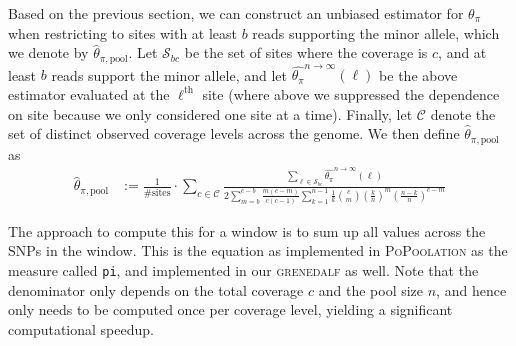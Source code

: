 \documentclass[a4paper,fontsize=9pt,DIV=14]{scrartcl}
\newcounter{todo}
\newcommand\todo[1]{}
\newcommand\toolname{\textsc}
\newcommand{\samplesize}{n}
\newcommand{\coverage}{c}
\newcommand{\thetapi}{\widehat{\theta_\pi}}
\begin{document}
Based on the previous section, we can construct an unbiased estimator for $\theta_\pi$ when restricting to sites with at least $b$ reads supporting the minor allele, which we denote by $\widehat{\theta}_{\pi,\text{pool}}$.  Let $\mathcal{S}_{bc}$ be the set of sites where the coverage is $c$, and at least $b$ reads support the minor allele, and let $\thetapi^{\samplesize\to\infty}(\ell)$ be the above estimator evaluated at the $\ell^\text{th}$ site (where above we suppressed the dependence on site because we only considered one site at a time).  Finally, let $\mathcal{C}$ denote the set of distinct observed coverage levels across the genome.  We then define  $\widehat{\theta}_{\pi,\text{pool}}$ as
%
\begin{align}
    \label{eq:ThetaPiPoolEstimate}
     \widehat{\theta}_{\pi,\text{pool}} &:= \frac{1}{\# \text{sites}} \cdot \sum_{c\in \mathcal{C}}
    \frac{
       \sum_{\ell \in \mathcal{S}_{bc}} \thetapi^{\samplesize\to\infty}(\ell)
    }{
        2\sum_{m=b}^{\coverage-b} \frac{m(\coverage-m)}{\coverage(\coverage-1)} \sum_{k=1}^{n-1} \frac{1}{k} \binom{\coverage}{m} \left(\frac{k}{\samplesize}\right)^m \left(\frac{\samplesize-k}{\samplesize}\right)^{\coverage-m}
    }
\end{align}
%

The approach to compute this for a window is to sum up all values across the SNPs in the window.
This is the equation as implemented in \toolname{PoPoolation} as the measure called \texttt{pi},
and implemented in our \toolname{grenedalf} as well. Note that the denominator only depends on the total coverage $\coverage$ and the pool size $\samplesize$, and hence only needs to be computed once per coverage level, yielding a significant computational speedup.
\end{document}
